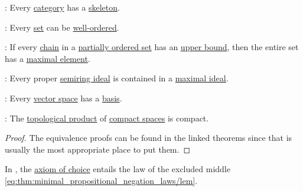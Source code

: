 \begin{theorem}
\begin{thmenum}[resume=thm:axiom_of_choice_equivalences]
     : Every \hyperref[def:category]{category} has a \hyperref[def:skeletal_category]{skeleton}.

     : Every \hyperref[def:set]{set} can be \hyperref[def:well_ordered_set]{well-ordered}.

     : If every \hyperref[def:partial_order_chain]{chain} in a \hyperref[def:partially_ordered_set]{partially ordered set} has an \hyperref[def:extremal_points/upper_and_lower_bounds]{upper bound}, then the entire set has a \hyperref[def:extremal_points/maximal_and_minimal_element]{maximal element}.

     : Every proper \hyperref[def:semiring_ideal]{semiring ideal} is contained in a \hyperref[def:semiring_ideal/maximal]{maximal ideal}.

     : Every \hyperref[def:vector_space]{vector space} has a \hyperref[def:hamel_basis]{basis}.

     : The \hyperref[def:topological_product]{topological product} of \hyperref[def:compact_space]{compact spaces} is compact.
  \end{thmenum}
\end{theorem}
\begin{proof}
  The equivalence proofs can be found in the linked theorems since that is usually the most appropriate place to put them.
\end{proof}

\begin{theorem}\label{thm:diaconescu_goodman_myhill_theorem}
  In \hyperref[def:zfc]{}, the \hyperref[def:zfc/choice]{axiom of choice} entails the law of the excluded middle \eqref{eq:thm:minimal_propositional_negation_laws/lem}.
\end{theorem}
